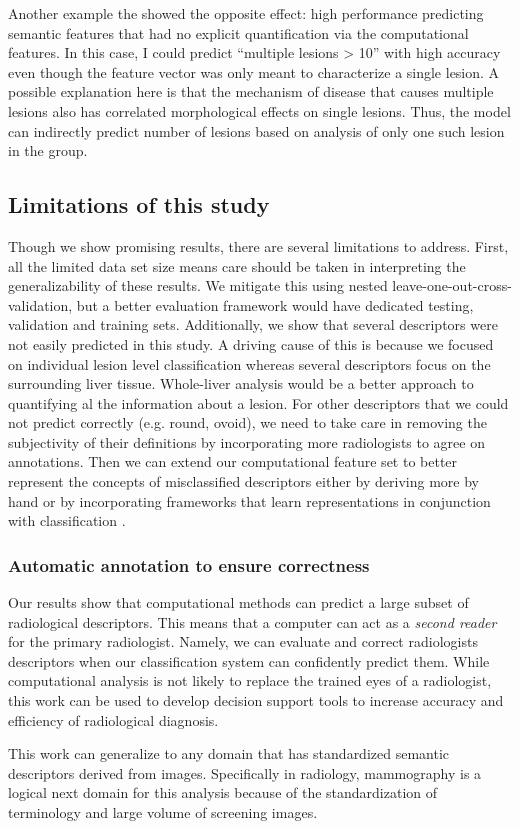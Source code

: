 Another example the showed the opposite effect: high performance predicting semantic features that had no explicit quantification via the computational features. In this case, I could predict ``multiple lesions > 10'' with high accuracy even though the feature vector was only meant to characterize a single lesion. A possible explanation here is that the mechanism of disease that causes multiple lesions also has correlated morphological effects on single lesions. Thus, the model can indirectly predict number of lesions based on analysis of only one such lesion in the group.

\subsection{Limitations of this study}
Though we show promising results, there are several limitations to address. 
First, all the limited data set size means care should be taken in interpreting the generalizability of these results.
We mitigate this using nested leave-one-out-cross-validation, but a better evaluation framework would have dedicated testing, validation and training sets.
Additionally, we show that several descriptors were not easily predicted in this study.
A driving cause of this is because we focused on individual lesion level classification whereas several descriptors focus on the surrounding liver tissue.
Whole-liver analysis would be a better approach to quantifying al the information about a lesion.
For other descriptors that we could not predict correctly (e.g. round, ovoid), we need to take care in removing the subjectivity of their definitions by incorporating more radiologists to agree on annotations.
Then we can extend our computational feature set to better represent the concepts of misclassified descriptors either by deriving more by hand or by incorporating frameworks that learn representations in conjunction with classification \cite{Hinton:2006bg}.

\subsubsection{Automatic annotation to ensure correctness}
Our results show that computational methods can predict a large subset of radiological descriptors. 
This means that a computer can act as a \emph{second reader} for the primary radiologist.
Namely, we can evaluate and correct radiologists descriptors when our classification system can confidently predict them.
While computational analysis is not likely to replace the trained eyes of a radiologist, this work can be used to develop decision support tools to increase accuracy and efficiency of radiological diagnosis.

This work can generalize to any domain that has standardized semantic descriptors derived from images.
Specifically in radiology, mammography is a logical next domain for this analysis because of the standardization of terminology and large volume of screening images.



